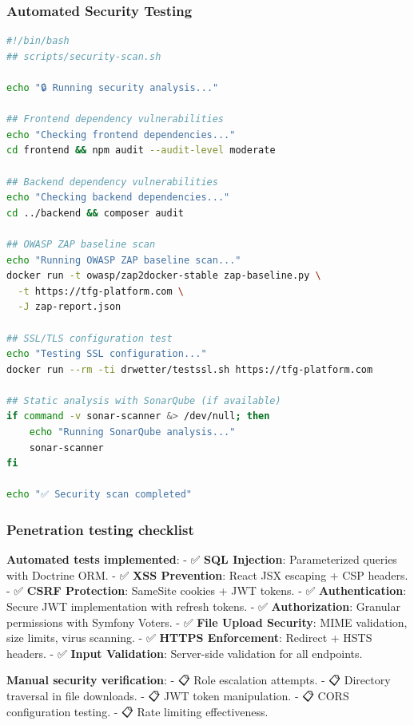 \documentclass[12pt,a4paper,oneside]{report}
\begin{document}
\subsubsection{Automated Security
Testing}\label{automated-security-testing}

\begin{lstlisting}[language=bash]
#!/bin/bash
## scripts/security-scan.sh

echo "🔒 Running security analysis..."

## Frontend dependency vulnerabilities
echo "Checking frontend dependencies..."
cd frontend && npm audit --audit-level moderate

## Backend dependency vulnerabilities  
echo "Checking backend dependencies..."
cd ../backend && composer audit

## OWASP ZAP baseline scan
echo "Running OWASP ZAP baseline scan..."
docker run -t owasp/zap2docker-stable zap-baseline.py \
  -t https://tfg-platform.com \
  -J zap-report.json

## SSL/TLS configuration test
echo "Testing SSL configuration..."
docker run --rm -ti drwetter/testssl.sh https://tfg-platform.com

## Static analysis with SonarQube (if available)
if command -v sonar-scanner &> /dev/null; then
    echo "Running SonarQube analysis..."
    sonar-scanner
fi

echo "✅ Security scan completed"
\end{lstlisting}

\subsubsection{Penetration testing
checklist}\label{penetration-testing-checklist}

\textbf{Automated tests implemented}: - ✅ \textbf{SQL Injection}:
Parameterized queries with Doctrine ORM. - ✅ \textbf{XSS Prevention}:
React JSX escaping + CSP headers. - ✅ \textbf{CSRF Protection}:
SameSite cookies + JWT tokens. - ✅ \textbf{Authentication}: Secure JWT
implementation with refresh tokens. - ✅ \textbf{Authorization}:
Granular permissions with Symfony Voters. - ✅ \textbf{File Upload
Security}: MIME validation, size limits, virus scanning. - ✅
\textbf{HTTPS Enforcement}: Redirect + HSTS headers. - ✅ \textbf{Input
Validation}: Server-side validation for all endpoints.

\textbf{Manual security verification}: - 📋 Role escalation attempts. -
📋 Directory traversal in file downloads. - 📋 JWT token manipulation. -
📋 CORS configuration testing. - 📋 Rate limiting effectiveness.
\end{document}
